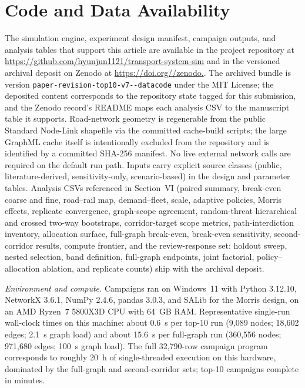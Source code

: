 \documentclass{ieeeaccess}
\begin{document}
\section*{Code and Data Availability}
The simulation engine, experiment design manifest, campaign outputs, and analysis tables that support this article are available in the project repository at
\underline{https://github.com/\allowbreak hyunjun1121/\allowbreak transport-system-sim}
and in the versioned archival deposit on Zenodo at
\underline{https://doi.\allowbreak org//\allowbreak zenodo.}.
The archived bundle is version \texttt{paper-revision-\allowbreak top10-\allowbreak v7--\allowbreak datacode} under the MIT License; the deposited content corresponds to the repository state tagged for this submission, and the Zenodo record's README maps each analysis CSV to the manuscript table it supports.
Road-network geometry is regenerable from the public Standard Node-Link shapefile via the committed cache-build scripts; the large GraphML cache itself is intentionally excluded from the repository and is identified by a committed SHA-256 manifest. No live external network calls are required on the default run path. Inputs carry explicit source classes (public, literature-derived, sensitivity-only, scenario-based) in the design and parameter tables. Analysis CSVs referenced in Section~VI (paired summary, break-even coarse and fine, road--rail map, demand--fleet, scale, adaptive policies, Morris effects, replicate convergence, graph-scope agreement, random-threat hierarchical and crossed two-way bootstraps, corridor-target scope metrics, path-interdiction inventory, allocation surface, full-graph break-even, break-even sensitivity, second-corridor results, compute frontier, and the review-response set: holdout sweep, nested selection, band definition, full-graph endpoints, joint factorial, policy--allocation ablation, and replicate counts) ship with the archival deposit.

\emph{Environment and compute.} Campaigns ran on Windows~11 with Python 3.12.10, NetworkX 3.6.1, NumPy 2.4.6, pandas 3.0.3, and SALib for the Morris design, on an AMD Ryzen~7 5800X3D CPU with 64~GB RAM. Representative single-run wall-clock times on this machine: about 0.6~s per top-10 run (9{,}089 nodes; 18{,}602 edges; 2.1~s graph load) and about 15.6~s per full-graph run (360{,}556 nodes; 971{,}680 edges; 100~s graph load). The full 32{,}790-row campaign program corresponds to roughly 20~h of single-threaded execution on this hardware, dominated by the full-graph and second-corridor sets; top-10 campaigns complete in minutes.
\end{document}
